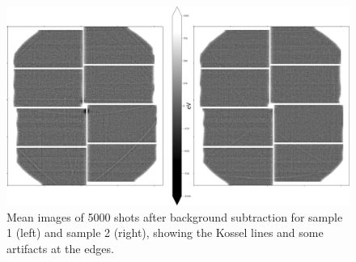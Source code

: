 \begin{figure}[h!]
	\centering
	\includegraphics[width=0.8\linewidth]{images/kossel_gaas.png}
	\caption[Mean image of fluorescence of GaAs after background subtraction with visible Kossel lines ]{Mean images of 5000 shots after background subtraction for sample 1 (left) and sample 2 (right), showing the Kossel lines and some artifacts at the edges.}
	\label{fig:kosselgaasmean}
\end{figure}


